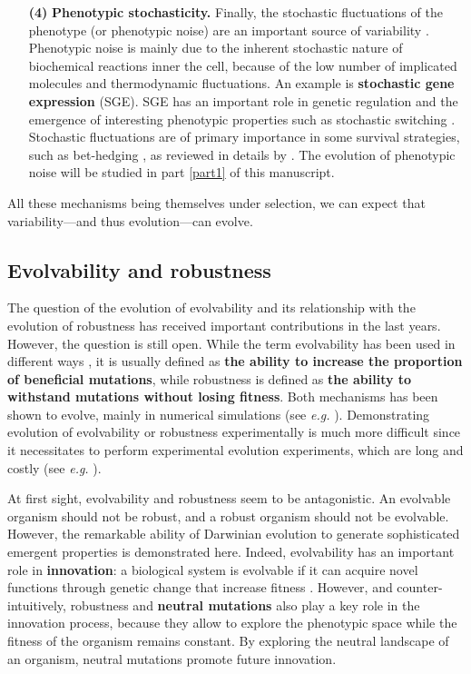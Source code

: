 \begin{enumerate}
\item[\textbf{(4)}] \textbf{Phenotypic stochasticity.}
Finally, the stochastic fluctuations of the phenotype (or phenotypic noise) are an important source of variability \citep{symmons-and-raj-2016}. Phenotypic noise is mainly due to the inherent stochastic nature of biochemical reactions inner the cell, because of the low number of implicated molecules and thermodynamic fluctuations. An example is \textbf{stochastic gene expression} (SGE). SGE has an important role in genetic regulation and the emergence of interesting phenotypic properties such as stochastic switching \citep{acar-et-al-2008,tsuru-et-al-2011}. Stochastic fluctuations are of primary importance in some survival strategies, such as bet-hedging \citep{veening-et-al-2008}, as reviewed in details by \cite{dejong-et-al-2011}. The evolution of phenotypic noise will be studied in part \ref{part1} of this manuscript.
\end{enumerate}

All these mechanisms being themselves under selection, we can expect that variability---and thus evolution---can evolve.


\subsection{Evolvability and robustness}
The question of the evolution of evolvability and its relationship with the evolution of robustness has received important contributions in the last years. However, the question is still open. While the term evolvability has been used in different ways \citep{wagner-2013}, it is usually defined as \textbf{the ability to increase the proportion of beneficial mutations}, while robustness is defined as \textbf{the ability to withstand mutations without losing fitness}. Both mechanisms has been shown to evolve, mainly in numerical simulations (see \textit{e.g.} \citealt{bedau-packard-2003,elena-sanjuan-2008,crombach-hogeweg-2008,beslon-et-al-2010a}). Demonstrating evolution of evolvability or robustness experimentally is much more difficult since it necessitates to perform experimental evolution experiments, which are long and costly (see \textit{e.g.} \citealt{elena-and-lenski-2003}).

At first sight, evolvability and robustness seem to be antagonistic. An evolvable organism should not be robust, and a robust organism should not be evolvable. However, the remarkable ability of Darwinian evolution to generate sophisticated emergent properties is demonstrated here. Indeed, evolvability has an important role in \textbf{innovation}: a biological system is evolvable if it can acquire novel functions through genetic change that increase fitness \citep{wagner-2005}. However, and counter-intuitively, robustness and \textbf{neutral mutations} also play a key role in the innovation process, because they allow to explore the phenotypic space while the fitness of the organism remains constant. By exploring the neutral landscape of an organism, neutral mutations promote future innovation.

